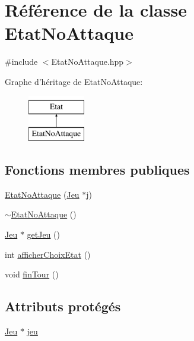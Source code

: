 \hypertarget{class_etat_no_attaque}{\section{\-Référence de la classe \-Etat\-No\-Attaque}
\label{class_etat_no_attaque}
}


{\ttfamily \#include $<$\-Etat\-No\-Attaque.\-hpp$>$}

\-Graphe d'héritage de \-Etat\-No\-Attaque\-:\begin{figure}[H]
\begin{center}
\leavevmode
\includegraphics[height=2.000000cm]{class_etat_no_attaque}
\end{center}
\end{figure}
\subsection*{\-Fonctions membres publiques}
\begin{DoxyCompactItemize}
\item 
\hyperlink{class_etat_no_attaque_a39b37880a28e5cbda92e584221b9a68d}{\-Etat\-No\-Attaque} (\hyperlink{class_jeu}{\-Jeu} $\ast$j)
\item 
\hyperlink{class_etat_no_attaque_a81a0114551961e5780e7e3866f22c6fb}{$\sim$\-Etat\-No\-Attaque} ()
\item 
\hyperlink{class_jeu}{\-Jeu} $\ast$ \hyperlink{class_etat_no_attaque_ab98d57f8da5876194e0c1496f137c613}{get\-Jeu} ()
\item 
int \hyperlink{class_etat_no_attaque_ac89ab0d1f4483c7623617299b08922e3}{afficher\-Choix\-Etat} ()
\item 
void \hyperlink{class_etat_no_attaque_aea58b2b3580f3adbd93a4fa69398b51e}{fin\-Tour} ()
\end{DoxyCompactItemize}
\subsection*{\-Attributs protégés}
\begin{DoxyCompactItemize}
\item 
\hyperlink{class_jeu}{\-Jeu} $\ast$ \hyperlink{class_etat_no_attaque_ad5dbee65b31bd41e28a648ac22bbbfce}{jeu}
\end{DoxyCompactItemize}



